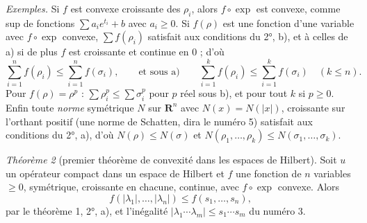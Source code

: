 \documentclass[11pt,a4paper]{article}
\begin{document}
\emph{Exemples.} Si $f$ est convexe croissante des $\rho_i$, alors $f\circ
\exp$ est convexe, comme sup de fonctions $\sum a_i e^{t_i} + b$ avec
$a_i \geq 0$. Si $f(\rho)$ est une fonction d'une variable avec $f\circ\exp$
convexe, $\sum f(\rho_i)$ satisfait aux conditions du 2°, b), et à celles de
a) si de plus $f$ est croissante et continue en $0$ ; d'où
\[
  \sum_{i=1}^{n} f(\rho_i) \leq \sum_{i=1}^{n} f(\sigma_i), \qquad\text{et sous a)}\qquad
  \sum_{i=1}^{k} f(\rho_i) \leq \sum_{i=1}^{k} f(\sigma_i)\quad (k \leq n) .
\]
Pour $f(\rho) = \rho^p$ : $\sum \rho_i^p \leq \sum \sigma_i^p$ pour $p$ réel
sous b), et pour tout $k$ si $p \geq 0$. Enfin toute \emph{norme}
symétrique $N$ sur $\mathbf{R}^n$ avec $N(x) = N(|x|)$, croissante sur
l'orthant positif (une norme de Schatten, dira le numéro 5) satisfait
aux conditions du 2°, a), d'où $N(\rho) \leq N(\sigma)$ et $N(\rho_1,
\ldots, \rho_k) \leq N(\sigma_1, \ldots, \sigma_k)$.

\emph{Théorème 2} (premier théorème de convexité dans les espaces de
Hilbert). Soit $u$ un opérateur compact dans un espace de Hilbert et $f$
une fonction de $n$ variables $\geq 0$, symétrique, croissante en chacune,
continue, avec $f\circ\exp$ convexe. Alors
\[
  f(|\lambda_1|, \ldots, |\lambda_n|) \leq f(s_1, \ldots, s_n),
\]
par le théorème 1, 2°, a), et l'inégalité $|\lambda_1 \cdots \lambda_m| \leq
s_1 \cdots s_m$ du numéro 3.
\end{document}

